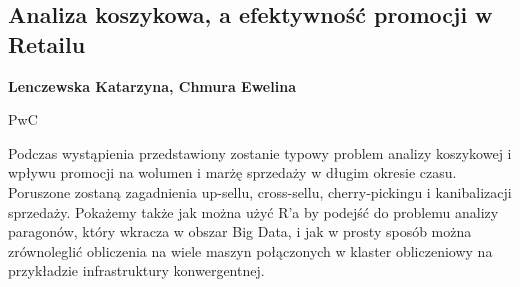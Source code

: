 \documentclass[\main/boa.tex]{subfiles}
\begin{document}
\subsection{Analiza koszykowa, a efektywność promocji w Retailu}

\begin{minipage}{0.915\textwidth}
	\centering
  {\bf {} Lenczewska Katarzyna,  Chmura Ewelina}
\end{minipage}


\begin{affiliations}
\begin{minipage}{0.915\textwidth}
\centering
PwC \\[-2pt]
\end{minipage}
\end{affiliations}

\vskip 0.3cm

 Podczas wystąpienia przedstawiony zostanie typowy problem analizy koszykowej \break i wpływu promocji na wolumen i marżę sprzedaży w długim okresie czasu. Poruszone zostaną zagadnienia up-sellu, cross-sellu, cherry-pickingu i kanibalizacji sprzedaży. Pokażemy także jak można użyć R'a by podejść do problemu analizy paragonów, który wkracza w obszar Big Data, i jak w prosty sposób można zrównoleglić obliczenia na wiele maszyn połączonych w klaster obliczeniowy na przykładzie infrastruktury konwergentnej. 
\end{document}
